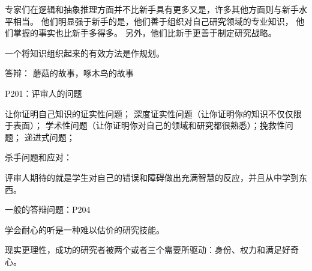 专家们在逻辑和抽象推理方面并不比新手具有更多又是，许多其他方面则与新手水平相当。
他们明显强于新手的是，他们善于组织对自己研究领域的专业知识，
他们掌握的事实也比新手多得多。
另外，他们比新手更善于制定研究战略。

一个将知识组织起来的有效方法是作规划。

答辩： 蘑菇的故事，啄木鸟的故事

P201：评审人的问题

让你证明自己知识的证实性问题； 深度证实性问题（让你证明你的知识不仅仅限于表面）；
学术性问题（让你证明你对自己的领域和研究都很熟悉）；挽救性问题；
递进式问题；

杀手问题和应对：

评审人期待的就是学生对自己的错误和障碍做出充满智慧的反应，并且从中学到东西。

一般的答辩问题：P204

学会耐心的听是一种难以估价的研究技能。

现实更理性，成功的研究者被两个或者三个需要所驱动：身份、权力和满足好奇心。



